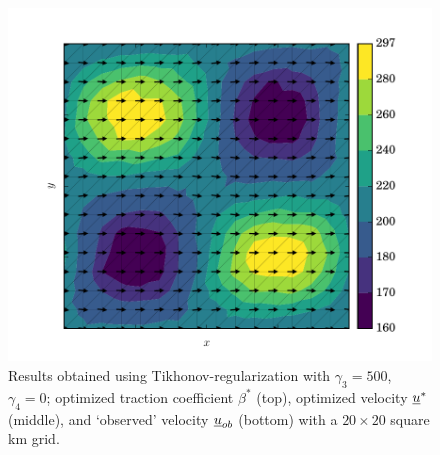 \begin{figure}
    \includegraphics[width=0.9\linewidth]{images/data_assimilation/ISMIP_HOM_C/Tikhonov_500/U_ob.pdf}
  \caption[Tikhonov-regularized inverse ISMIP-HOM results with $\gamma_3=500$]{Results obtained using Tikhonov-regularization with $\gamma_3=500$, $\gamma_4=0$; optimized traction coefficient $\beta^*$ (top), optimized velocity $\underline{u}^*$ (middle), and `observed' velocity $\underline{u}_{ob}$ (bottom) with a $20 \times 20$ square km grid.}
  \label{inverse_ismip_opt_tikhonov_500}
\end{figure}
